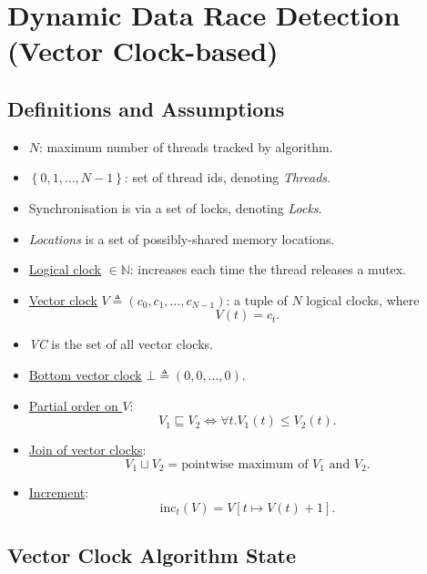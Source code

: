 \documentclass[twocolumn,landscape,10pt]{article}
\theoremstyle{definition}
\begin{document}
\newpage
\section{Dynamic Data Race Detection (Vector Clock-based)}

\subsection{Definitions and Assumptions}

\begin{itemize}
    \item $N$: maximum number of threads tracked by algorithm.
    \item $\left\{0,1,\ldots,N - 1\right\}$: set of thread ids, denoting
        \emph{Threads}.
    \item Synchronisation is via a set of locks, denoting \emph{Locks}.
    \item \emph{Locations} is a set of possibly-shared memory locations.
    \item \underline{Logical clock} $\in\mathbb{N}$: increases each time the
        thread releases a mutex.
    \item \underline{Vector clock} $V\triangleq (c_0,c_1,\ldots,c_{N-1})$: 
        a tuple of $N$ logical clocks, where
        \[
            V(t)=c_t.
        \]
    \item \emph{VC} is the set of all vector clocks.
    \item \underline{Bottom vector clock} $\bot \triangleq(0,0,\ldots,0)$.
    \item \underline{Partial order on $V$}:
        \[
            V_1\sqsubseteq V_2 \iff \forall t.V_1(t)\le V_2(t).
        \]
    \item \underline{Join of vector clocks}:
        \[
            V_1\sqcup V_2 = \text{pointwise maximum of $V_1$ and $V_2$}.
        \]
    \item \underline{Increment}:
        \[
            \text{inc}_t(V)=V[t\mapsto V(t)+1].
        \]
\end{itemize} 

\subsection{Vector Clock Algorithm State}
\end{document}
